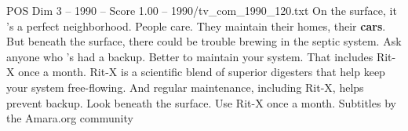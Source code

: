 \begin{textsample}{POS Dim 3 – 1990 – Score 1.00 – 1990/tv\_com\_1990\_120.txt}  \label{ex:f3_pos_078}
On the surface, it 's a perfect neighborhood.
People care.
They maintain their homes, their \textbf{cars}.
But beneath the surface, there could be trouble brewing in the septic system.
Ask anyone who 's had a backup.
Better to maintain your system.
That includes Rit-X once a month.
Rit-X is a scientific blend of superior digesters that help keep your system free-flowing.
And regular maintenance, including Rit-X, helps prevent backup.
Look beneath the surface.
Use Rit-X once a month.
Subtitles by the Amara.org community

\end{textsample}

